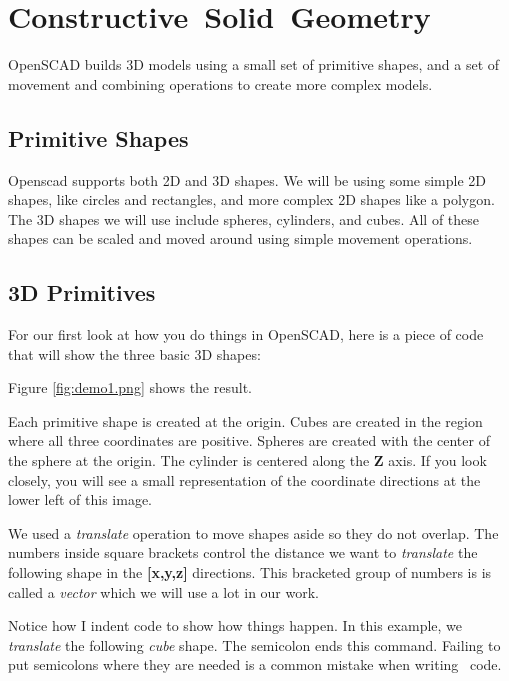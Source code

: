 \section*{\mbox{Constructive Solid Geometry}}

OpenSCAD builds 3D models using a small set of primitive shapes, and a set of
movement and combining operations to create more complex models.

\subsection*{Primitive Shapes}

Openscad supports both 2D and 3D shapes. We will be using some simple 2D
shapes, like circles and rectangles, and more complex 2D shapes like a polygon.
The 3D shapes we will use include spheres, cylinders, and cubes. All of these
shapes can be scaled and moved around using simple movement operations.

\subsection*{3D Primitives}
For our first look at how you do things in OpenSCAD, here is a piece of code
that will show the three basic 3D shapes:


Figure \ref{fig:demo1.png} shows the result.


Each primitive shape is created at the origin. Cubes are created in the region
where all three coordinates are positive. Spheres are created with the center
of the sphere at the origin. The cylinder is centered along the {\bf Z} axis.
If you look closely, you will see a small representation of the coordinate
directions at the lower left of this image.

We used a {\it translate} operation to move shapes aside so they do not
overlap. The numbers inside square brackets control the distance we want to
{\it translate} the following shape in the {\bf [x,y,z]} directions. This
bracketed group of numbers is is called a {\it vector} which we will use a lot
in our work.

Notice how I indent code to show how things happen. In this example, we {\it
translate} the following {\it cube} shape. The semicolon ends this command.
Failing to put semicolons where they are needed is a common mistake when
writing \osc\ code.

